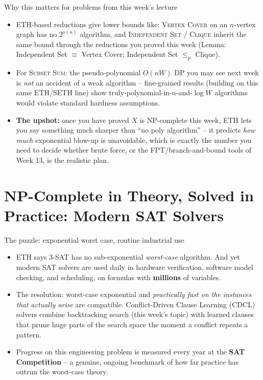 \documentclass[11pt,aspectratio=169]{beamer}
\begin{document}
\begin{frame}{Why this matters for problems from this week's lecture}
  \begin{itemize}
    \item ETH-based reductions give lower bounds like: \textsc{Vertex Cover} on an
    $n$-vertex graph has no $2^{o(n)}$ algorithm, and \textsc{Independent Set} /
    \textsc{Clique} inherit the same bound through the reductions you proved this week
    (Lemma: Independent Set $\equiv$ Vertex Cover; Independent Set $\le_p$ Clique).
    \item For \textsc{Subset Sum}: the pseudo-polynomial $O(nW)$ DP you may see next
    week is \emph{not} an accident of a weak algorithm -- fine-grained results (building
    on this same ETH/SETH line) show truly-polynomial-in-$n$-and-$\log W$ algorithms
    would violate standard hardness assumptions.
    \item \textbf{The upshot:} once you have proved $X$ is NP-complete this week, ETH
    lets you say something much sharper than ``no poly algorithm'' -- it predicts
    \emph{how much} exponential blow-up is unavoidable, which is exactly the number you
    need to decide whether brute force, or the FPT/branch-and-bound tools of Week 13,
    is the realistic plan.
  \end{itemize}
\end{frame}

\section{NP-Complete in Theory, Solved in Practice: Modern SAT Solvers}

\begin{frame}{The puzzle: exponential worst case, routine industrial use}
  \begin{itemize}
    \item ETH says 3-SAT has no sub-exponential \emph{worst-case} algorithm. And yet
    modern SAT solvers are used daily in hardware verification, software model
    checking, and scheduling, on formulas with \textbf{millions} of variables.
    \item The resolution: worst-case exponential and \emph{practically fast on the
    instances that actually arise} are compatible. Conflict-Driven Clause Learning
    (CDCL) solvers combine backtracking search (this week's topic) with learned
    clauses that prune huge parts of the search space the moment a conflict repeats a
    pattern.
    \item Progress on this engineering problem is measured every year at the
    \textbf{SAT Competition} -- a genuine, ongoing benchmark of how far practice has
    outrun the worst-case theory.
  \end{itemize}
\end{frame}
\end{document}
